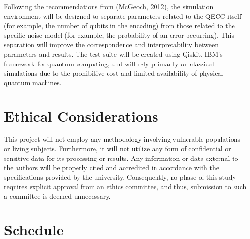 \documentclass[12pt]{article}
\begin{document}
Following the recommendations from (McGeoch, 2012), the simulation environment will be designed to separate parameters related to the QECC itself (for example, the number of qubits in the encoding) from those related to the specific noise model (for example, the probability of an error occurring). This separation will improve the correspondence and interpretability between parameters and results. The test suite will be created using Qiskit, IBM's framework for quantum computing, and will rely primarily on classical simulations due to the prohibitive cost and limited availability of physical quantum machines.

\section{Ethical Considerations}

This project will not employ any methodology involving vulnerable populations or living subjects. Furthermore, it will not utilize any form of confidential or sensitive data for its processing or results. Any information or data external to the authors will be properly cited and accredited in accordance with the specifications provided by the university. Consequently, no phase of this study requires explicit approval from an ethics committee, and thus, submission to such a committee is deemed unnecessary.


\section{Schedule}
\end{document}
